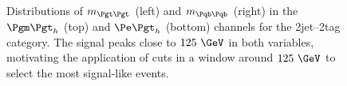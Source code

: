 \begin{figure}
\begin{center}

\end{center}
\caption{
Distributions of $m_{\Pgt\Pgt}$ (left) and $m_{\Pqb\Pqb}$ (right) in the $\mutau$ (top) and
$\etau$ (bottom) channels for the 2jet--2tag category. The signal peaks close to $125~\GeV$ in both
variables, motivating the application of cuts in a window around $125~\GeV$ to
select the most signal-like events.}
\label{fig:2jet2tagmttmbb}
\end{figure} 

